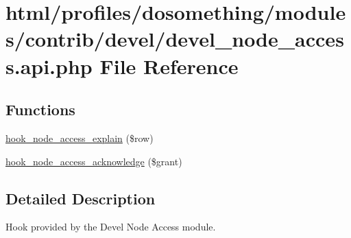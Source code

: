 \hypertarget{devel__node__access_8api_8php}{
\section{html/profiles/dosomething/modules/contrib/devel/devel\_\-node\_\-access.api.php File Reference}
\label{devel__node__access_8api_8php}
}
\subsection*{Functions}
\begin{DoxyCompactItemize}
\item 
\hyperlink{group__node__access_gaeedf3adea0813fb3631f26d0de83a68d}{hook\_\-node\_\-access\_\-explain} (\$row)
\item 
\hyperlink{group__node__access_gac5a197ac3564b867c2921fb496063ae6}{hook\_\-node\_\-access\_\-acknowledge} (\$grant)
\end{DoxyCompactItemize}


\subsection{Detailed Description}
Hook provided by the Devel Node Access module. 